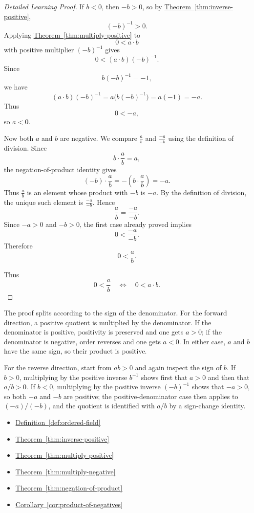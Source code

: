 \begin{proof}[Detailed Learning Proof]
If $b<0$, then $-b>0$, so by
\hyperref[thm:inverse-positive]{Theorem~\ref*{thm:inverse-positive}},
\[
(-b)^{-1}>0.
\]
Applying
\hyperref[thm:multiply-positive]{Theorem~\ref*{thm:multiply-positive}}
to
\[
0<a\cdot b
\]
with positive multiplier $(-b)^{-1}$ gives
\[
0<(a\cdot b)(-b)^{-1}.
\]
Since
\[
b(-b)^{-1}=-1,
\]
we have
\[
(a\cdot b)(-b)^{-1}=a\bigl(b(-b)^{-1}\bigr)=a(-1)=-a.
\]
Thus
\[
0<-a,
\]
so $a<0$.

Now both $a$ and $b$ are negative.  We compare $\frac{a}{b}$ and
$\frac{-a}{-b}$ using the definition of division.  Since
\[
b\cdot\frac{a}{b}=a,
\]
the negation-of-product identity gives
\[
(-b)\cdot\frac{a}{b}
=
-\left(b\cdot\frac{a}{b}\right)
=
-a.
\]
Thus $\frac{a}{b}$ is an element whose product with $-b$ is $-a$.  By the
definition of division, the unique such element is $\frac{-a}{-b}$.  Hence
\[
\frac{a}{b}=\frac{-a}{-b}.
\]
Since $-a>0$ and $-b>0$, the first case already proved implies
\[
0<\frac{-a}{-b}.
\]
Therefore
\[
0<\frac{a}{b}.
\]

Thus
\[
0<\frac{a}{b}
\quad\Longleftrightarrow\quad
0<a\cdot b.
\]
\end{proof}

\begin{remark*}
The proof splits according to the sign of the denominator.  For the forward
direction, a positive quotient is multiplied by the denominator.  If the
denominator is positive, positivity is preserved and one gets $a>0$; if the
denominator is negative, order reverses and one gets $a<0$.  In either case,
$a$ and $b$ have the same sign, so their product is positive.

For the reverse direction, start from $ab>0$ and again inspect the sign of
$b$.  If $b>0$, multiplying by the positive inverse $b^{-1}$ shows first that
$a>0$ and then that $a/b>0$.  If $b<0$, multiplying by the positive inverse
$(-b)^{-1}$ shows that $-a>0$, so both $-a$ and $-b$ are positive; the
positive-denominator case then applies to $(-a)/(-b)$, and the quotient is
identified with $a/b$ by a sign-change identity.
\end{remark*}

\begin{dependencies}
\begin{itemize}
  \item \hyperref[def:ordered-field]{Definition~\ref*{def:ordered-field}}
  \item \hyperref[thm:inverse-positive]{Theorem~\ref*{thm:inverse-positive}}
  \item \hyperref[thm:multiply-positive]{Theorem~\ref*{thm:multiply-positive}}
  \item \hyperref[thm:multiply-negative]{Theorem~\ref*{thm:multiply-negative}}
  \item \hyperref[thm:negation-of-product]{Theorem~\ref*{thm:negation-of-product}}
  \item \hyperref[cor:product-of-negatives]{Corollary~\ref*{cor:product-of-negatives}}
\end{itemize}
\end{dependencies}

\clearpage
